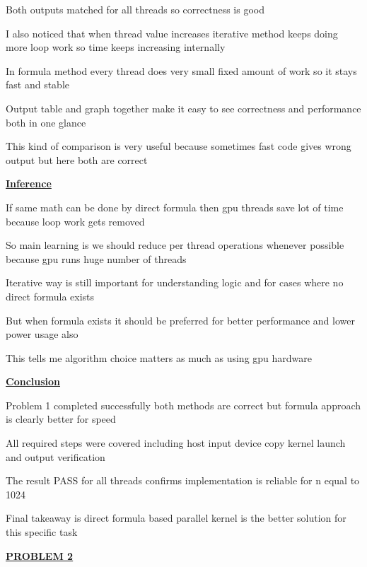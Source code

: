 \documentclass[12pt]{article}
\begin{document}
Both outputs matched for all threads so correctness is good

I also noticed that when thread value increases iterative method keeps doing more loop work so time keeps increasing internally

In formula method every thread does very small fixed amount of work so it stays fast and stable

Output table and graph together make it easy to see correctness and performance both in one glance

This kind of comparison is very useful because sometimes fast code gives wrong output but here both are correct

\vspace{0.8cm}

\textbf{\Large \underline{Inference}}

\vspace{0.5cm}

If same math can be done by direct formula then gpu threads save lot of time because loop work gets removed

So main learning is we should reduce per thread operations whenever possible because gpu runs huge number of threads

Iterative way is still important for understanding logic and for cases where no direct formula exists

But when formula exists it should be preferred for better performance and lower power usage also

This tells me algorithm choice matters as much as using gpu hardware

\vspace{0.8cm}

\textbf{\Large \underline{Conclusion}}

\vspace{0.5cm}

Problem 1 completed successfully both methods are correct but formula approach is clearly better for speed

All required steps were covered including host input device copy kernel launch and output verification

The result PASS for all threads confirms implementation is reliable for n equal to 1024

Final takeaway is direct formula based parallel kernel is the better solution for this specific task

\newpage

\noindent
{\Huge\underline{\textbf{PROBLEM 2}}}
\end{document}
